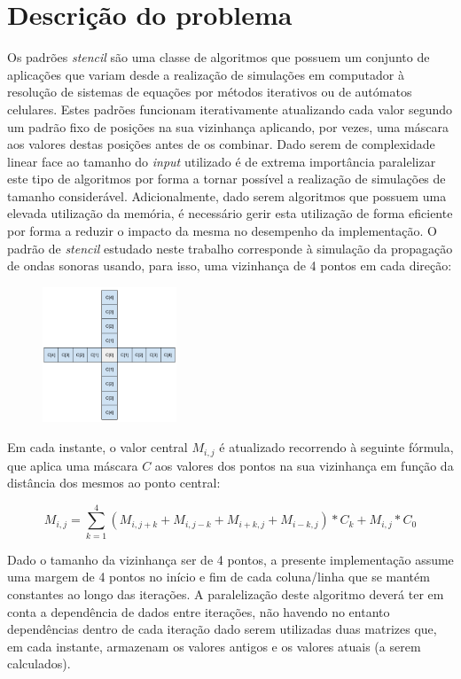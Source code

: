 \documentclass{article}
\begin{document}
\section{Descrição do problema}\label{algorithm}
Os padrões \textit{stencil} são uma classe de algoritmos que possuem um conjunto de aplicações que variam desde a realização de simulações em computador à resolução de sistemas de equações por métodos iterativos ou de autómatos celulares.
Estes padrões funcionam iterativamente atualizando cada valor segundo um padrão fixo de posições na sua vizinhança aplicando, por vezes, uma máscara aos valores destas posições antes de os combinar. Dado serem de complexidade linear face ao tamanho 
do \textit{input} utilizado é de extrema importância paralelizar este tipo de algoritmos por forma a tornar possível a realização de simulações de tamanho considerável. Adicionalmente, dado serem algoritmos que possuem uma elevada utilização da memória,
é necessário gerir esta utilização de forma eficiente por forma a reduzir o impacto da mesma no desempenho da implementação.
O padrão de \textit{stencil} estudado neste trabalho corresponde à simulação da propagação de ondas sonoras usando, para isso, uma vizinhança de 4 pontos em cada direção:
\begin{figure}[H]
    \centering
    \includegraphics[width=4cm]{Pictures/stencil_abstract_imp.png}
\end{figure}

Em cada instante, o valor central $M_{i,j}$ é atualizado recorrendo à seguinte fórmula, que aplica uma máscara $C$ aos valores dos pontos na sua vizinhança em função da distância dos mesmos ao ponto central:

$$M_{i,j} = \sum_{k=1}^{4} (M_{i,j+k}+M_{i,j-k}+M_{i+k,j}+M_{i-k,j})*C_k + M_{i,j}*C_0$$

Dado o tamanho da vizinhança ser de 4 pontos, a presente implementação assume uma margem de 4 pontos no início e fim de cada coluna/linha que se mantém constantes ao longo das iterações.
A paralelização deste algoritmo deverá ter em conta a dependência de dados entre iterações, não havendo no entanto dependências dentro de cada iteração dado serem utilizadas duas matrizes que, em cada instante, armazenam os valores antigos e os valores atuais (a serem calculados).
\end{document}
